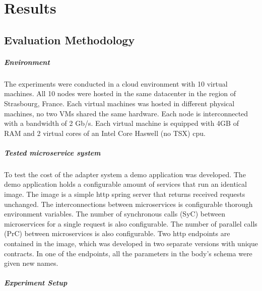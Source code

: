 
%

\chapter{Results}
\label{cha:results}

\section{Evaluation Methodology} %
\label{sec:evaluation_methodology}

\paragraph{Environment}

The experiments were conducted in a cloud environment with 10 virtual machines.
All 10 nodes were hosted in the same datacenter in the region of Strasbourg, France.
Each virtual machines was hosted in different physical machines, no two VMs shared the same hardware.
Each node is interconnected with a bandwidth of 2 Gb/s.
Each virtual machine is equipped with 4GB of RAM and 2 virtual cores of an Intel Core Haswell (no TSX) cpu.

\paragraph{Tested microservice system }

To test the cost of the adapter system a demo application was developed.
The demo application holds a configurable amount of services that run an identical image.
The image is a simple http spring server that returns received requests unchanged.
The interconnections between microservices is configurable thorough environment variables.
The number of synchronous calls (SyC) between microservices for a single request is also configurable.
The number of parallel calls (PrC) between microservices is also configurable.
Two http endpoints are contained in the image, which was developed in two separate versions with unique contracts.
In one of the endpoints, all the parameters in the body's schema were given new names.

\paragraph{Experiment Setup}

